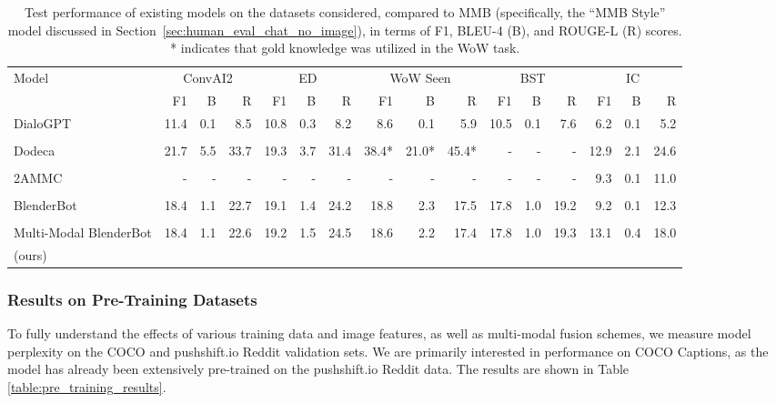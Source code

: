 \documentclass[11pt,a4paper]{article}
\begin{document}
\begin{table*}[t!]
\begin{center}
\small
\scriptsize
\begin{tabular}{|l|rrr|rrr|rrr|rrr|rrr|}
 \hline
Model & \multicolumn{3}{|c|}{ConvAI2} & \multicolumn{3}{|c|}{ED} & \multicolumn{3}{|c|}{WoW Seen} & \multicolumn{3}{|c|}{BST} & \multicolumn{3}{|c|}{IC} \\
& F1 & B & R & F1 & B & R & F1 & B & R & F1 & B & R & F1 & B & R \\
\hline
\hline
DialoGPT & 11.4 & 0.1 & 8.5 & 10.8 & 0.3 & 8.2 & 8.6 & 0.1 & 5.9 & 10.5 & 0.1 & 7.6 & 6.2 & 0.1 & 5.2 \\
\cite{zhang2019dialogpt} & & & & & & & & & & & & & & & \\
\hline
Dodeca & 21.7 & 5.5 & 33.7 & 19.3 & 3.7 & 31.4 & 38.4* & 21.0* & 45.4* & - & - & - & 12.9 & 2.1 & 24.6 \\
\cite{shuster2019dialogue}& & & & & & & & & & & & & & &\\
\hline
2AMMC & - & - & - & - & - & - & - & - & - & - & - & - & 9.3 & 0.1 & 11.0 \\
\cite{ju2019allinone} & & & & & & & & & & & & & & & \\
\hline
BlenderBot & 18.4 & 1.1 & 22.7 & 19.1 & 1.4 & 24.2 & 18.8 & 2.3 & 17.5 & 17.8 & 1.0 & 19.2 & 9.2 & 0.1 & 12.3 \\
\cite{roller2020recipes} & & & & & & & & & & & & & & & \\
\hline
\hline
Multi-Modal BlenderBot & 18.4 & 1.1 & 22.6 & 19.2 & 1.5 & 24.5 & 18.6 & 2.2 & 17.4 & 17.8 & 1.0 & 19.3 & 13.1 & 0.4 & 18.0 \\
(ours) & & & & & & & & & & & & & & & \\
\hline
\end{tabular}
\caption{Test performance of existing models on the datasets considered, compared to MMB (specifically, the ``MMB Style'' model discussed in Section~\ref{sec:human_eval_chat_no_image}), in terms of F1, BLEU-4 (B), and ROUGE-L (R) scores. * indicates that gold knowledge was utilized in the WoW task.
\label{table:final_auto_results_existing}
}
\end{center}
\end{table*}



\subsubsection{Results on Pre-Training Datasets}
To fully understand the effects of various training data and image features, as well as multi-modal fusion schemes, we measure model perplexity on the COCO and pushshift.io Reddit validation sets. We are primarily interested in performance on COCO Captions, as the model has already been extensively pre-trained on the pushshift.io Reddit data. The results are shown in Table \ref{table:pre_training_results}. 
\end{document}
